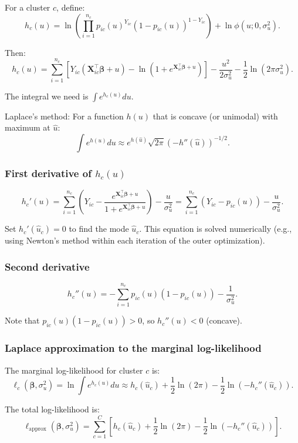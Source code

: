 \documentclass[12pt]{article}
\numberwithin{equation}{section}
\begin{document}
	For a cluster $c$, define:
	\[
	h_c(u) = \ln\left( \prod_{i=1}^{n_c} p_{ic}(u)^{Y_{ic}} (1-p_{ic}(u))^{1-Y_{ic}} \right) + \ln \phi(u; 0, \sigma_u^2).
	\]
	
	Then:
	\[
	h_c(u) = \sum_{i=1}^{n_c} \left[ Y_{ic} (\mathbf{X}_{ic}^\top \boldsymbol{\beta} + u) - \ln\left(1 + e^{\mathbf{X}_{ic}^\top \boldsymbol{\beta} + u}\right) \right] - \frac{u^2}{2\sigma_u^2} - \frac{1}{2}\ln(2\pi\sigma_u^2).
	\]
	
	The integral we need is $\int e^{h_c(u)} du$.
	
	Laplace's method: For a function $h(u)$ that is concave (or unimodal) with maximum at $\hat{u}$:
	\[
	\int e^{h(u)} du \approx e^{h(\hat{u})} \sqrt{2\pi} \left( -h''(\hat{u}) \right)^{-1/2}.
	\]
	
	\subsubsection{First derivative of $h_c(u)$}
	\[
	h_c'(u) = \sum_{i=1}^{n_c} \left( Y_{ic} - \frac{e^{\mathbf{X}_{ic}^\top \boldsymbol{\beta} + u}}{1 + e^{\mathbf{X}_{ic}^\top \boldsymbol{\beta} + u}} \right) - \frac{u}{\sigma_u^2} = \sum_{i=1}^{n_c} (Y_{ic} - p_{ic}(u)) - \frac{u}{\sigma_u^2}.
	\]
	
	Set $h_c'(\hat{u}_c) = 0$ to find the mode $\hat{u}_c$. This equation is solved numerically (e.g., using Newton's method within each iteration of the outer optimization).
	
	\subsubsection{Second derivative}
	\[
	h_c''(u) = -\sum_{i=1}^{n_c} p_{ic}(u)(1-p_{ic}(u)) - \frac{1}{\sigma_u^2}.
	\]
	
	Note that $p_{ic}(u)(1-p_{ic}(u)) > 0$, so $h_c''(u) < 0$ (concave).
	
	\subsubsection{Laplace approximation to the marginal log-likelihood}
	
	The marginal log-likelihood for cluster $c$ is:
	\[
	\ell_c(\boldsymbol{\beta}, \sigma_u^2) = \ln \int e^{h_c(u)} du \approx h_c(\hat{u}_c) + \frac{1}{2} \ln(2\pi) - \frac{1}{2} \ln\left(-h_c''(\hat{u}_c)\right).
	\]
	
	The total log-likelihood is:
	\[
	\ell_{\text{approx}}(\boldsymbol{\beta}, \sigma_u^2) = \sum_{c=1}^C \left[ h_c(\hat{u}_c) + \frac{1}{2} \ln(2\pi) - \frac{1}{2} \ln\left(-h_c''(\hat{u}_c)\right) \right].
	\]
	
\end{document}
